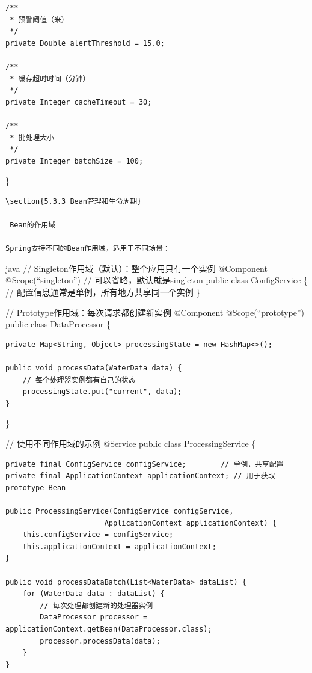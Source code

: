 \begin{verbatim}
/**
 * 预警阈值（米）
 */
private Double alertThreshold = 15.0;

/**
 * 缓存超时时间（分钟）
 */
private Integer cacheTimeout = 30;

/**
 * 批处理大小
 */
private Integer batchSize = 100;
\end{verbatim}

\}

\begin{lstlisting}
\section{5.3.3 Bean管理和生命周期}

 Bean的作用域

Spring支持不同的Bean作用域，适用于不同场景：
\end{lstlisting}

java // Singleton作用域（默认）：整个应用只有一个实例 @Component @Scope(``singleton'') // 可以省略，默认就是singleton public class ConfigService \{ // 配置信息通常是单例，所有地方共享同一个实例 \}

// Prototype作用域：每次请求都创建新实例 @Component @Scope(``prototype'') public class DataProcessor \{

\begin{verbatim}
private Map<String, Object> processingState = new HashMap<>();

public void processData(WaterData data) {
    // 每个处理器实例都有自己的状态
    processingState.put("current", data);
}
\end{verbatim}

\}

// 使用不同作用域的示例 @Service public class ProcessingService \{

\begin{verbatim}
private final ConfigService configService;        // 单例，共享配置
private final ApplicationContext applicationContext; // 用于获取prototype Bean

public ProcessingService(ConfigService configService, 
                       ApplicationContext applicationContext) {
    this.configService = configService;
    this.applicationContext = applicationContext;
}

public void processDataBatch(List<WaterData> dataList) {
    for (WaterData data : dataList) {
        // 每次处理都创建新的处理器实例
        DataProcessor processor = applicationContext.getBean(DataProcessor.class);
        processor.processData(data);
    }
}
\end{verbatim}


